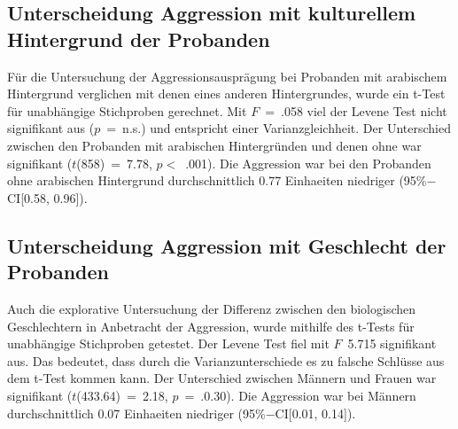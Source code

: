 \subsection{Unterscheidung Aggression mit kulturellem Hintergrund der Probanden}   \label{subsec_4.4.3}
Für die Untersuchung der Aggressionsausprägung bei Probanden mit arabischem Hintergrund verglichen mit denen eines anderen Hintergrundes, wurde ein t-Test für unabhängige Stichproben gerechnet. Mit $F$~=~.058 viel der Levene Test nicht signifikant aus ($p$~=~n.s.) und entspricht einer Varianzgleichheit. 
Der Unterschied zwischen den Probanden mit arabischen Hintergründen und denen ohne war signifikant ($t$(858)~=~7.78, $p<$~.001). Die Aggression war bei den Probanden ohne arabischen Hintergrund durchschnittlich 0.77 Einhaeiten niedriger (95\%$-$CI[0.58, 0.96]).


\subsection{Unterscheidung Aggression mit Geschlecht der Probanden}   \label{subsec_4.4.4}
Auch die explorative Untersuchung der Differenz zwischen den biologischen Geschlechtern in Anbetracht der Aggression, wurde mithilfe des t-Tests für unabhängige Stichproben getestet. Der Levene Test fiel mit $F$~5.715 signifikant aus. Das bedeutet, dass durch die Varianzunterschiede es zu falsche Schlüsse aus dem t-Test kommen kann.
Der Unterschied zwischen Männern und Frauen war signifikant ($t$(433.64)~=~2.18, $p$~=~.0.30). Die Aggression war bei Männern durchschnittlich 0.07 Einhaeiten niedriger (95\%$-$CI[0.01, 0.14]).
